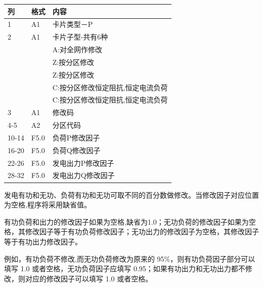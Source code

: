 \begin{spacing}{1.0}
\begin{longtable}[h]{llp{}}
\toprule
列 & 格式 & 内容\\
 \midrule
1 & A1 & 卡片类型－P\\
2 & A1 & 卡片子型-共有6种\\ 
 & & A:对全网作修改\\
 & & Z:按分区修改\\
 & & Z:按分区修改\\
 & & C:按分区修改恒定阻抗,恒定电流负荷\\
 & & C:按分区修改恒定阻抗,恒定电流负荷\\
3 & A1 & 修改码 \\
4-5 & A2 & 分区代码 \\
10-14 & F5.0&负荷P修改因子\\
 16-20 & F5.0 & 负荷Q修改因子\\
 22-26 & F5.0 & 发电出力P修改因子\\
 28-32 & F5.0 & 发电出力Q修改因子\\
\bottomrule
\end{longtable}
\end{spacing}

发电有功和无功、负荷有功和无功可取不同的百分数做修改。当修改因子对应位置为空格,程序将采用缺省值。

有功负荷和出力的修改因子如果为空格,缺省为1.0；无功负荷的修改因子如果为空格，其修改因子等于有功负荷修改因子；无功出力的修改因子为空格，其修改因子等于有功出力修改因子。

例如，有功负荷不修改,而无功负荷修改为原来的 95\%，则有功负荷因子部分可以填写 1.0 或者空格，无功负荷因子应填写 0.95；如果有功出力和无功出力都不修改，则对应的修改因子可以填写 1.0 或者空格。


